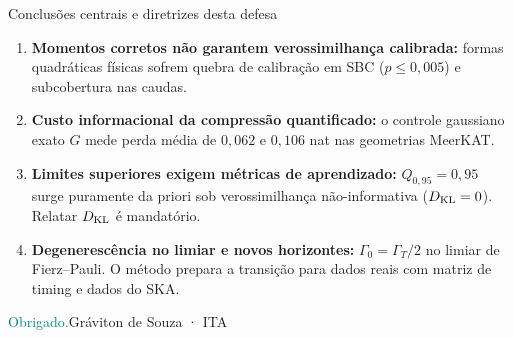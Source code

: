 \documentclass[aspectratio=169,11pt]{beamer}
\newif\ifbackup
\begin{document}
\begin{frame}{Conclusões centrais e diretrizes desta defesa}
\begin{enumerate}\setlength\itemsep{2mm}
\item \textbf{Momentos corretos não garantem verossimilhança calibrada:} formas quadráticas físicas sofrem quebra de calibração em SBC ($p \le 0{,}005$) e subcobertura nas caudas.
\item \textbf{Custo informacional da compressão quantificado:} o controle gaussiano exato $G$ mede perda média de $0{,}062$ e $0{,}106$ nat nas geometrias MeerKAT.
\item \textbf{Limites superiores exigem métricas de aprendizado:} $Q_{0{,}95} = 0{,}95$ surge puramente da priori sob verossimilhança não-informativa ($D_{\rm KL} = 0$). Relatar $D_{\rm KL}$ é mandatório.
\item \textbf{Degenerescência no limiar e novos horizontes:} $\Gamma_0 = \Gamma_T/2$ no limiar de Fierz--Pauli. O método prepara a transição para dados reais com matriz de timing e dados do SKA.
\end{enumerate}\vspace{2mm}\textcolor{Teal}{\Large Obrigado.}\hfill\small Gráviton de Souza · ITA
\end{frame}
\appendix\backuptrue
\end{document}
